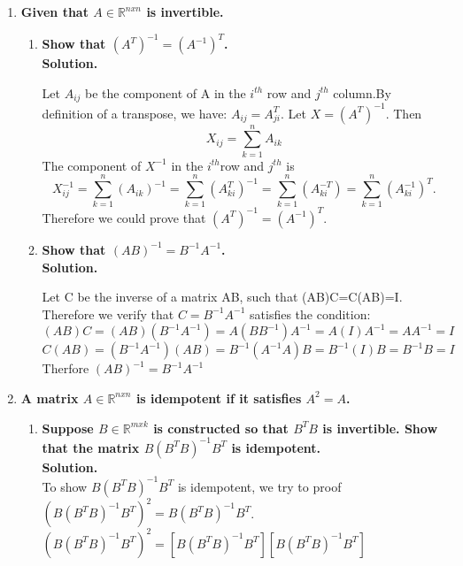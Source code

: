 \documentclass[12pt, oneside]{article}   	%
\begin{document}
\begin{enumerate}
	
	\item \textbf{Given that $A \in \mathbb{R}^{nxn}$ is invertible.}
	\begin{enumerate}
		\item \textbf{Show that $(A^T)^{-1}=(A^{-1})^T$.}\\
		
		\textbf{Solution.}
		
		Let $A_{ij}$ be the component of A in the $i^{th}$ row and $j^{th}$ column.By definition of a transpose, we have: $ A_{ij}=A_{ji}^T. $ Let $X=(A^T)^{-1}$. Then\\
		$$
		X_{ij}= \sum_{k=1}^{n}A_{ik}
		$$
		The component of $X^{-1}$ in the $i^{th}$row and $j^{th}$ is
		$$
		X_{ij}^{-1}= \sum_{k=1}^{n}(A_{ik})^{-1}=\sum_{k=1}^{n}(A_{ki}^T)^{-1}=\sum_{k=1}^{n}(A_{ki}^{-T})=\sum_{k=1}^{n}(A_{ki}^{-1})^{T}.
		$$
		Therefore we could prove that $(A^T)^{-1}=(A^{-1})^T$.\\
		
		
		\item  \textbf{Show that $(AB)^{-1} = B^{-1}A^{-1}$.}\\
		
		\textbf{Solution.}
		
		Let C be the inverse of a matrix AB, such that (AB)C=C(AB)=I.  Therefore we verify that 
		$C=B^{-1}A^{-1}$ satisfies the condition:\\
		$$
		(AB)C=(AB)(B^{-1}A^{-1})= A(BB^{-1})A^{-1}=A(I)A^{-1}=AA^{-1}=I
		$$
		$$
		C(AB)=(B^{-1}A^{-1})(AB)= B^{-1}(A^{-1}A)B=B^{-1}(I)B=B^{-1}B=I
		$$
		Therfore $(AB)^{-1} = B^{-1}A^{-1}$\\
		
	\end{enumerate}
	\item \textbf{A matrix $A \in \mathbb{R}^{nxn}$ is idempotent if it satisfies $A^2 =A$.}
	\begin{enumerate}
		\item \textbf{Suppose $B \in \mathbb{R}^{mxk}$ is constructed so that $ B^T B$ is invertible. Show that the matrix  $B(B^T B)^{-1} B^T$ is idempotent.}\\
		
		\textbf{Solution.}\\
			To show $B(B^TB)^{-1}B^T$ is idempotent, we try to proof  $(B(B^TB)^{-1}B^T)^2=B(B^TB)^{-1}B^T$.\\
		
		$(B(B^TB)^{-1}B^T)^2=[B(B^TB)^{-1}B^T][B(B^TB)^{-1}B^T]$\\
		

\end{enumerate}
\end{enumerate}
\end{document}
